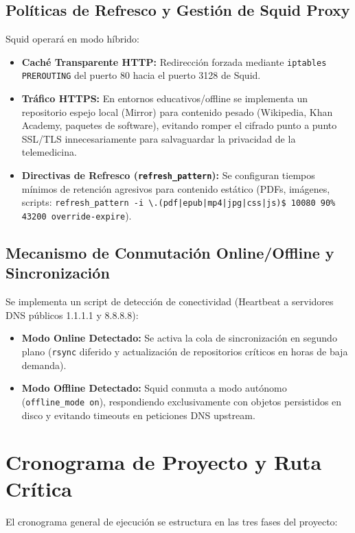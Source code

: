 \documentclass[conference]{IEEEtran}
\begin{document}
\subsection{Políticas de Refresco y Gestión de Squid Proxy}
Squid operará en modo híbrido:
\begin{itemize}
    \item \textbf{Caché Transparente HTTP:} Redirección forzada mediante \texttt{iptables PREROUTING} del puerto 80 hacia el puerto 3128 de Squid.
    \item \textbf{Tráfico HTTPS:} En entornos educativos/offline se implementa un repositorio espejo local (Mirror) para contenido pesado (Wikipedia, Khan Academy, paquetes de software), evitando romper el cifrado punto a punto SSL/TLS innecesariamente para salvaguardar la privacidad de la telemedicina.
    \item \textbf{Directivas de Refresco (\texttt{refresh\_pattern}):} Se configuran tiempos mínimos de retención agresivos para contenido estático (PDFs, imágenes, scripts: \texttt{refresh\_pattern -i \textbackslash.(pdf|epub|mp4|jpg|css|js)\$ 10080 90\% 43200 override-expire}).
\end{itemize}

\subsection{Mecanismo de Conmutación Online/Offline y Sincronización}
Se implementa un script de detección de conectividad (Heartbeat a servidores DNS públicos 1.1.1.1 y 8.8.8.8):
\begin{itemize}
    \item \textbf{Modo Online Detectado:} Se activa la cola de sincronización en segundo plano (\texttt{rsync} diferido y actualización de repositorios críticos en horas de baja demanda).
    \item \textbf{Modo Offline Detectado:} Squid conmuta a modo autónomo (\texttt{offline\_mode on}), respondiendo exclusivamente con objetos persistidos en disco y evitando timeouts en peticiones DNS upstream.
\end{itemize}

\section{Cronograma de Proyecto y Ruta Crítica}

El cronograma general de ejecución se estructura en las tres fases del proyecto:
\end{document}
